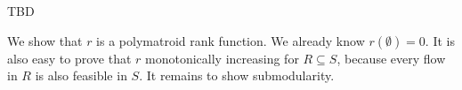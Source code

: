 \begin{aufgabe}
    TBD
\end{aufgabe}
\begin{aufgabe} \label{ex:6.2}
    We show that $r$ is a polymatroid rank function. We already know $r(\emptyset)=0$.
    It is also easy to prove that $r$ monotonically increasing for $R \subseteq S$, because every flow in $R$ is also feasible in $S$.
    It remains to show submodularity.
\end{aufgabe}